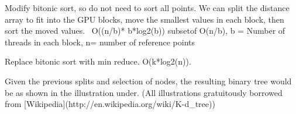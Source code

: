 


    \item Modify bitonic sort, so do not need to sort all points. We can split the distance array to fit into the GPU blocks, move the smallest values in each block, then sort the moved values. ~O((n/b)* b*log2(b)) subsetof O(n/b), b = Number of threads in each block, n= number of reference points
    \item Replace bitonic sort with min reduce. O(k*log2(n)).






Given the previous splits and selection of nodes, the resulting binary tree would be as shown in the illustration under. (All illustrations gratuitously borrowed from [Wikipedia](http://en.wikipedia.org/wiki/K-d_tree))

